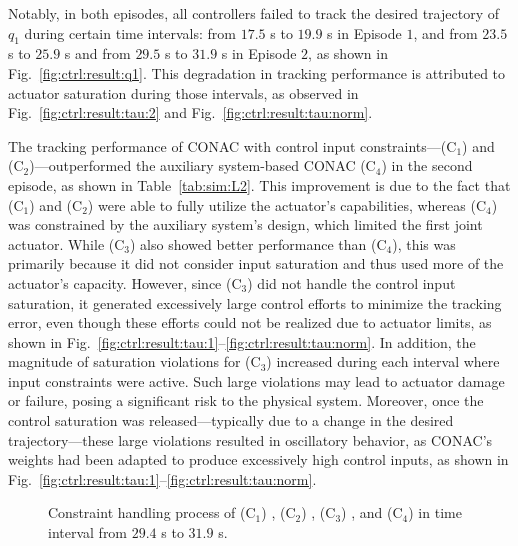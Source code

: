 \documentclass[journal]{IEEEtran}
\begin{document}
Notably, in both episodes, all controllers failed to track the desired trajectory of $q_1$ during certain time intervals: from $17.5$ s to $19.9$ s in Episode $1$, and from $23.5$ s to $25.9$ s and from $29.5$ s to $31.9$ s in Episode $2$, as shown in Fig.~\ref{fig:ctrl:result:q1}.
This degradation in tracking performance is attributed to actuator saturation during those intervals, as observed in Fig.~\ref{fig:ctrl:result:tau:2} and Fig.~\ref{fig:ctrl:result:tau:norm}.

The tracking performance of CONAC with control input constraints—\ie (C$_1$) and (C$_2$)—outperformed the auxiliary system-based CONAC (C$_4$) in the second episode, as shown in Table~\ref{tab:sim:L2}.
This improvement is due to the fact that (C$_1$) and (C$_2$) were able to fully utilize the actuator's capabilities, whereas (C$_4$) was constrained by the auxiliary system's design, which limited the first joint actuator.
While (C$_3$) also showed better performance than (C$_4$), this was primarily because it did not consider input saturation and thus used more of the actuator's capacity.
However, since (C$_3$) did not handle the control input saturation, it generated excessively large control efforts to minimize the tracking error, even though these efforts could not be realized due to actuator limits, as shown in Fig.~\ref{fig:ctrl:result:tau:1}–\ref{fig:ctrl:result:tau:norm}.
In addition, the magnitude of saturation violations for (C$_3$) increased during each interval where input constraints were active.
Such large violations may lead to actuator damage or failure, posing a significant risk to the physical system.
Moreover, once the control saturation was released—typically due to a change in the desired trajectory—these large violations resulted in oscillatory behavior, as CONAC's weights had been adapted to produce excessively high control inputs, as shown in Fig.~\ref{fig:ctrl:result:tau:1}–\ref{fig:ctrl:result:tau:norm}.

\begin{figure}[t]
    \centering
    \subfloat[Control input $\tau$ locus in time interval from $29.4$ s to $31.9$ s.]{
        \texttt{[image: 
            src/measurement/figures/compare/Fig6.eps
        ]}%
        \label{fig:ctrl:result:scope:control}}
        \vfill
        \vfill
  \caption{
    Constraint handling process of (C$_1$) \protect{}, (C$_2$) \protect{}, (C$_3$) \protect{}, and (C$_4$) \protect{} in time interval from $29.4$ s to $31.9$ s.
  }
\label{fig:ctrl:result:scope}
\end{figure}
\end{document}
